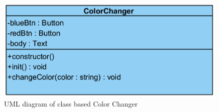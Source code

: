 \begin{figure}[h]
\includegraphics{png/ColorChangerUML.png}
\caption{UML diagram of class based Color Changer}
\centering
\end{figure}